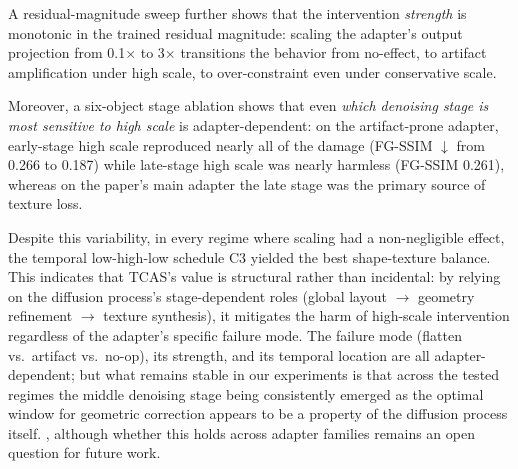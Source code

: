 \documentclass[times,twocolumn,final]{elsarticle}
\providecommand{\DIFadd}[1]{{\protect\color{blue} \sf #1}} %
\providecommand{\DIFdel}[1]{{\protect\color{red} \scriptsize #1}} %
\providecommand{\DIFaddbegin}{} %
\providecommand{\DIFaddend}{} %
\providecommand{\DIFdelbegin}{} %
\providecommand{\DIFdelend}{} %
\newcommand{\DIFscaledelfig}{0.5}
\newlength{\DIFdelgraphicswidth} %
\newlength{\DIFdelgraphicsheight} %
\newcommand{\DIFaddincludegraphics}[2][]{{\color{blue}\fbox{\DIFOincludegraphics[#1]{#2}}}} %
\newcommand{\DIFdelincludegraphics}[2][]{%
\sbox{\DIFdelgraphicsbox}{\DIFOincludegraphics[#1]{#2}}%
\settoboxwidth{\DIFdelgraphicswidth}{\DIFdelgraphicsbox} %
\settoboxtotalheight{\DIFdelgraphicsheight}{\DIFdelgraphicsbox} %
\scalebox{\DIFscaledelfig}{%
\parbox[b]{\DIFdelgraphicswidth}{\usebox{\DIFdelgraphicsbox}\\[-\baselineskip] \rule{\DIFdelgraphicswidth}{0em}}\llap{\resizebox{\DIFdelgraphicswidth}{\DIFdelgraphicsheight}{%
\setlength{\unitlength}{\DIFdelgraphicswidth}%
\begin{picture}(1,1)%
\thicklines\linethickness{2pt} %
{\color[rgb]{1,0,0}\put(0,0){\framebox(1,1){}}}%
{\color[rgb]{1,0,0}\put(0,0){\line( 1,1){1}}}%
{\color[rgb]{1,0,0}\put(0,1){\line(1,-1){1}}}%
\end{picture}%
}\hspace*{3pt}}} %
} %
\DeclareRobustCommand{\DIFaddbegin}{\DIFOaddbegin \let\includegraphics\DIFaddincludegraphics} %
\DeclareRobustCommand{\DIFaddend}{\DIFOaddend \let\includegraphics\DIFOincludegraphics} %
\DeclareRobustCommand{\DIFdelbegin}{\DIFOdelbegin \let\includegraphics\DIFdelincludegraphics} %
\DeclareRobustCommand{\DIFdelend}{\DIFOaddend \let\includegraphics\DIFOincludegraphics} %
\begin{document}
A residual-magnitude sweep further shows that the intervention \emph{strength} is monotonic in the trained residual magnitude: scaling the adapter's output projection from 0.1$\times$ to 3$\times$ transitions the behavior from no-effect, to artifact amplification under high scale, to over-constraint even under conservative scale.

Moreover, a \DIFaddbegin \DIFadd{six-object }\DIFaddend stage ablation shows that even \emph{which denoising stage is most sensitive to high scale} is adapter-dependent: on the artifact-prone adapter, early-stage high scale reproduced nearly all of the damage (FG-SSIM $\downarrow$ from 0.266 to 0.187) while late-stage high scale was nearly harmless (FG-SSIM 0.261), whereas on the paper's main adapter the late stage was the primary source of texture loss.

Despite this variability, in every regime where scaling had a non-negligible effect, the temporal low-high-low schedule C3 yielded the best shape-texture balance. This indicates that TCAS's value is structural rather than incidental: by relying on the diffusion process's stage-dependent roles (global layout $\to$ geometry refinement $\to$ texture synthesis), it mitigates the harm of high-scale intervention regardless of the adapter's specific failure mode. The failure mode (flatten vs.\ artifact vs.\ no-op), its strength, and its temporal location are all adapter-dependent; \DIFdelbegin \DIFdel{but }\DIFdelend \DIFaddbegin \DIFadd{what remains stable in our experiments is that across the tested regimes }\DIFaddend the middle denoising stage \DIFdelbegin \DIFdel{being }\DIFdelend \DIFaddbegin \DIFadd{consistently emerged as }\DIFaddend the optimal window for geometric correction\DIFdelbegin \DIFdel{appears to be a property of the diffusion process itself.}\DIFdelend \DIFaddbegin \DIFadd{, although whether this holds across adapter families remains an open question for future work.
}
\end{document}
